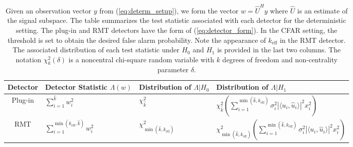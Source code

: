 \begin{table*}[h]
\centering
\begin{tabular}{clll}\toprule
 Detector & Detector Statistic $\Lambda(w)$  & Distribution of $\Lambda|H_0$ & Distribution of $\Lambda|H_1$\\
\midrule
Plug-in & $\sum_{i=1}^{\widehat{k}}w_i^2$ & $\chi^2_{\widehat{k}}$ & $\chi^2_{\widehat{k}}\left(\sum_{i=1}^{\min(\widehat{k},k_\text{eff})}\sigma_i^2|\langle u_i,\widehat{u}_i\rangle|^2x_i^2\right)$\\
 RMT& $\sum_{i=1}^{\min(k_\text{eff},\widehat{k})}w_i^2$ & $\chi^2_{\min(\widehat{k},k_\text{eff})}$ & $\chi^2_{\min(\widehat{k},k_\text{eff})}\left(\sum_{i=1}^{\min(\widehat{k},k_\text{eff})}\sigma_i^2|\langle u_i,\widehat{u}_i\rangle|^2x_i^2\right)$\\
\bottomrule
\end{tabular}
\caption{Given an observation vector $y$ from (\ref{eq:determ_setup}), we form the vector $w=\widehat{U}^Hy$ where $\widehat{U}$ is an estimate of the signal subspace. The table summarizes the test statistic associated with each detector for the deterministic setting. The plug-in and RMT detectors have the form of (\ref{eq:detector_form}). In the CFAR setting, the threshold is  set to obtain the desired false alarm probability. Note the appearance of $k_\text{eff}$ in the RMT detector. The associated distribution of each test statistic under $H_0$ and $H_1$ is provided in the last two columns. The notation $\chi^2_{k}(\delta)$ is a noncentral chi-square random variable with $k$ degrees of freedom and non-centrality parameter $\delta$.}\vskip-0.2cm
\label{table:summary_determ}
\end{table*}
